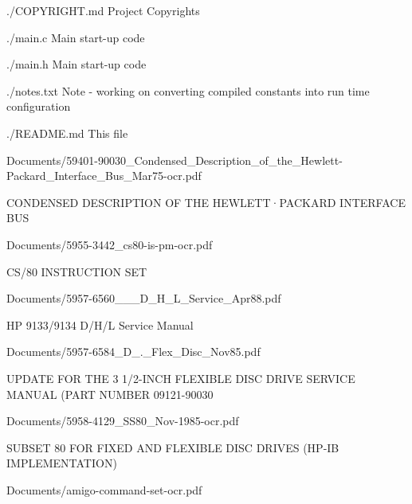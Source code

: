 {\bfseries 
\begin{DoxyItemize}
\item ./\+C\+O\+P\+Y\+R\+I\+G\+HT.md Project Copyrights
\item ./main.c Main start-\/up code
\item ./main.h Main start-\/up code
\item ./notes.txt Note -\/ working on converting compiled constants into run time configuration
\item ./\+R\+E\+A\+D\+ME.md This file
\item Documents/59401-\/90030\+\_\+\+Condensed\+\_\+\+Description\+\_\+of\+\_\+the\+\_\+\+Hewlett-\/\+Packard\+\_\+\+Interface\+\_\+\+Bus\+\_\+\+Mar75-\/ocr.\+pdf
\begin{DoxyItemize}
\item C\+O\+N\+D\+E\+N\+S\+ED D\+E\+S\+C\+R\+I\+P\+T\+I\+ON OF T\+HE H\+E\+W\+L\+E\+T\+T·\+P\+A\+C\+K\+A\+RD I\+N\+T\+E\+R\+F\+A\+CE B\+US
\end{DoxyItemize}
\item Documents/5955-\/3442\+\_\+cs80-\/is-\/pm-\/ocr.\+pdf
\begin{DoxyItemize}
\item C\+S/80 I\+N\+S\+T\+R\+U\+C\+T\+I\+ON S\+ET
\end{DoxyItemize}
\item Documents/5957-\/6560\+\_\+\_\+\_\+\+D\+\_\+\+H\+\_\+\+L\+\_\+\+Service\+\_\+\+Apr88.\+pdf
\begin{DoxyItemize}
\item HP 9133/9134 D/\+H/L Service Manual
\end{DoxyItemize}
\item Documents/5957-\/6584\+\_\+D\+\_.\+\_\+\+Flex\+\_\+\+Disc\+\_\+\+Nov85.\+pdf
\begin{DoxyItemize}
\item U\+P\+D\+A\+TE F\+OR T\+HE 3 1/2-\/\+I\+N\+CH F\+L\+E\+X\+I\+B\+LE D\+I\+SC D\+R\+I\+VE S\+E\+R\+V\+I\+CE M\+A\+N\+U\+AL (P\+A\+RT N\+U\+M\+B\+ER 09121-\/90030
\end{DoxyItemize}
\item Documents/5958-\/4129\+\_\+\+S\+S80\+\_\+\+Nov-\/1985-\/ocr.\+pdf
\begin{DoxyItemize}
\item S\+U\+B\+S\+ET 80 F\+OR F\+I\+X\+ED A\+ND F\+L\+E\+X\+I\+B\+LE D\+I\+SC D\+R\+I\+V\+ES (H\+P-\/\+IB I\+M\+P\+L\+E\+M\+E\+N\+T\+A\+T\+I\+ON)
\end{DoxyItemize}
\item Documents/amigo-\/command-\/set-\/ocr.\+pdf

\end{DoxyItemize}}
